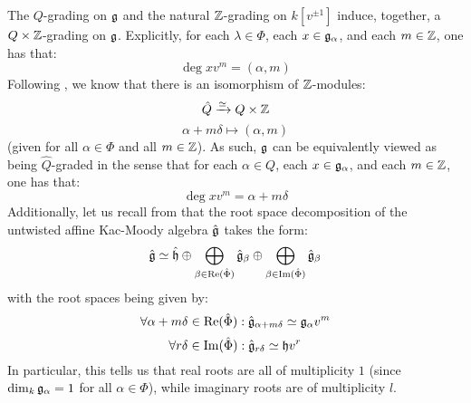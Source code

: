         The $Q$-grading on $\mathfrak{g}$ and the natural $\mathbb{Z}$-grading on $k[v^{\pm 1}]$ induce, together, a $Q \x \Z$-grading on $\mathfrak{g}$. Explicitly, for each $\lambda \in \Phi$, each $x \in \mathfrak{g}_{\alpha}$, and each $m \in \mathbb{Z}$, one has that:
            $$\deg x v^m = (\alpha, m)$$
        Following \cite[Chapter 6]{kac_infinite_dimensional_lie_algebras}, we know that there is an isomorphism of $\mathbb{Z}$-modules:
            $$\hat{Q} \xrightarrow[]{\cong} Q \x \Z$$
            $$\alpha + m\delta \mapsto (\alpha, m)$$
        (given for all $\alpha \in \Phi$ and all $m \in \mathbb{Z}$). As such, $\mathfrak{g}$ can be equivalently viewed as being $\hat{Q}$-graded in the sense that for each $\alpha \in Q$, each $x \in \mathfrak{g}_{\alpha}$, and each $m \in \mathbb{Z}$, one has that:
            $$\deg x v^m = \alpha + m\delta$$
        Additionally, let us recall from \cite[Chapter 7]{kac_infinite_dimensional_lie_algebras} that the root space decomposition of the untwisted affine Kac-Moody algebra $\hat{\mathfrak{g}}$ takes the form:
            $$\hat{\mathfrak{g}} \simeq \hat{\mathfrak{h}} \oplus \bigoplus_{\beta \in \operatorname{Re}(\hat{\Phi})} \hat{\mathfrak{g}}_{\beta} \oplus \bigoplus_{\beta \in \operatorname{Im}(\hat{\Phi})} \hat{\mathfrak{g}}_{\beta}$$
        with the root spaces being given by:
            $$\forall \alpha + m\delta \in \operatorname{Re}(\hat{\Phi}): \hat{\mathfrak{g}}_{\alpha + m\delta} \simeq \mathfrak{g}_{\alpha} v^m$$
            $$\forall r\delta \in \operatorname{Im}(\hat{\Phi}): \hat{\mathfrak{g}}_{r\delta} \simeq \mathfrak{h} v^r$$
        In particular, this tells us that real roots are all of multiplicity $1$ (since $\dim_k \mathfrak{g}_{\alpha} = 1$ for all $\alpha \in \Phi$), while imaginary roots are of multiplicity $l$.
            
